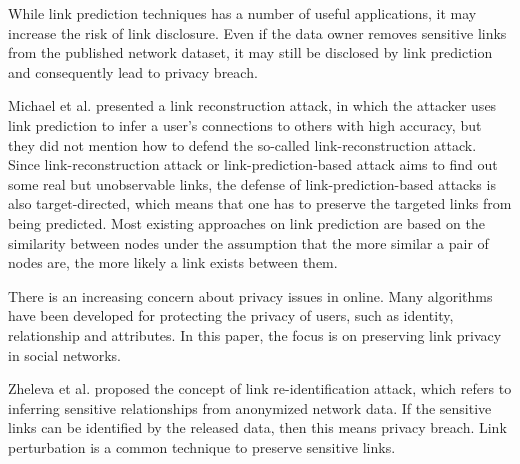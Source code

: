 While link prediction techniques has a number of useful applications, it may increase the risk of link disclosure. Even if the data owner removes sensitive links from the published network dataset, it may still be disclosed by link prediction and consequently lead to privacy breach. 

Michael et al. \cite{fire2013links} presented a link reconstruction attack, in which the attacker uses link prediction to infer a user's connections to others with high accuracy, but they did not mention how to defend the so-called link-reconstruction attack. Since link-reconstruction attack or link-prediction-based attack aims to find out some real but unobservable links, the defense of link-prediction-based attacks is also target-directed, which means that one has to preserve the targeted links from being predicted. Most existing approaches on link prediction are based on the similarity between nodes under the assumption that the more similar a pair of nodes are, the more likely a link exists between them.

There is an increasing concern about privacy issues in online. Many algorithms have been developed for protecting the privacy of users, such as identity, relationship and attributes. In this paper, the focus is on preserving link privacy in social networks.


Zheleva et al. \cite{zheleva2008preserving} proposed the concept of link re-identification attack, which refers to inferring sensitive relationships from anonymized network data. If the sensitive links can be identified by the released data, then this means privacy breach. Link perturbation is a common technique to preserve sensitive links. 

